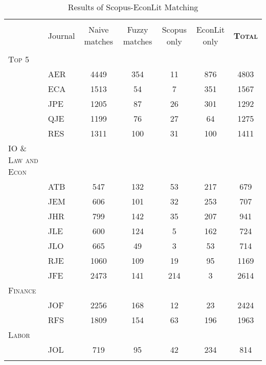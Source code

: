 
\begin{table}[h] \centering 
  \caption{Results of Scopus-EconLit Matching} 
  \label{} 
\begin{adjustbox}{max width = \textwidth}
\begin{tabular}{@{\extracolsep{5pt}} llccccc} 
\\[-1.8ex]\hline 
\hline \\[-1.8ex] 
 & Journal & Naive matches & Fuzzy matches & Scopus only & EconLit only &  \textsc{\textbf{Total}} \\ 
\hline \\[-1.8ex] 
\textsc{Top 5} & & & & & & \\ 
 & AER & 4449 & 354 & 11 & 876 & 4803 \\ 
 & ECA & 1513 & 54 & 7 & 351 & 1567 \\ 
 & JPE & 1205 & 87 & 26 & 301 & 1292 \\ 
 & QJE & 1199 & 76 & 27 & 64 & 1275 \\ 
 & RES & 1311 & 100 & 31 & 100 & 1411 \\ 
\textsc{IO \& Law and Econ} & & & & & & \\ 
 & ATB & 547 & 132 & 53 & 217 & 679 \\ 
 & JEM & 606 & 101 & 32 & 253 & 707 \\ 
 & JHR & 799 & 142 & 35 & 207 & 941 \\ 
 & JLE & 600 & 124 & 5 & 162 & 724 \\ 
 & JLO & 665 & 49 & 3 & 53 & 714 \\ 
 & RJE & 1060 & 109 & 19 & 95 & 1169 \\ 
 & JFE & 2473 & 141 & 214 & 3 & 2614 \\ 
\textsc{Finance} & & & & & & \\ 
 & JOF & 2256 & 168 & 12 & 23 & 2424 \\ 
 & RFS & 1809 & 154 & 63 & 196 & 1963 \\ 
\textsc{Labor} & & & & & & \\ 
 & JOL & 719 & 95 & 42 & 234 & 814 \\ 
\hline \\[-1.8ex] 
\end{tabular} 
\end{adjustbox} 
\end{table} 
